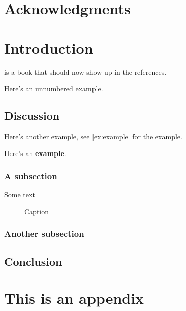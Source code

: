 \documentclass[12pt,twoside]{report}
\begin{document}
\clearpage\chapter*{Acknowledgments}




\normalsize
\newpage
{}
\doublespacing
\setlength{\parindent}{1.5em}

\chapter{Introduction}\label{introduction}

\citet{anderson1985phonology} is a book that should now show up in the references.

\begin{exe} \ex \label{staednacds} \begin{xlist}
\end{xlist}
\end{exe}

Here's an unnumbered example.

\begin{exe} 
\end{exe}



\section {Discussion}

Here's another example, see \ref{ex:example} for the example.

\begin{exe}
\ex\label{ex:example} Here's an \textbf{example}.
\end{exe}

\subsection{A subsection}
Some text

\begin{figure}[ht] %
    \centering
    \caption{Caption}
    \label{fig:mylabel}
\end{figure}
 

\subsection{Another subsection}

\section{Conclusion}


\appendix
\chapter{This is an appendix}

\clearpage\singlespacing



\end{document}
